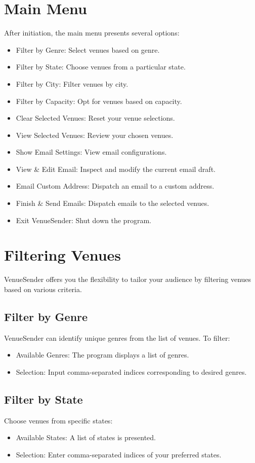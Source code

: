 \documentclass{article}
\begin{document}
	\section*{Main Menu}
	After initiation, the main menu presents several options:
	\begin{itemize}
		\item Filter by Genre: Select venues based on genre.
		\item Filter by State: Choose venues from a particular state.
		\item Filter by City: Filter venues by city.
		\item Filter by Capacity: Opt for venues based on capacity.
		\item Clear Selected Venues: Reset your venue selections.
		\item View Selected Venues: Review your chosen venues.
		\item Show Email Settings: View email configurations.
		\item View \& Edit Email: Inspect and modify the current email draft.
		\item Email Custom Address: Dispatch an email to a custom address.
		\item Finish \& Send Emails: Dispatch emails to the selected venues.
		\item Exit VenueSender: Shut down the program.
	\end{itemize}
	
	\section*{Filtering Venues}
	VenueSender offers you the flexibility to tailor your audience by filtering venues based on various criteria.
	
	\subsection*{Filter by Genre}
	VenueSender can identify unique genres from the list of venues. To filter:
	\begin{itemize}
		\item Available Genres: The program displays a list of genres.
		\item Selection: Input comma-separated indices corresponding to desired genres.
	\end{itemize}
	
	\subsection*{Filter by State}
	Choose venues from specific states:
	\begin{itemize}
		\item Available States: A list of states is presented.
		\item Selection: Enter comma-separated indices of your preferred states.
	\end{itemize}
	
\end{document}
